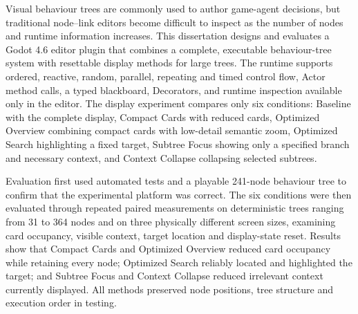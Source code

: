 \frontmatter
{}
\tableofcontents
\clearforchapter\listoffigures
\clearforchapter\listoftables

Visual behaviour trees are commonly used to author game-agent decisions, but traditional node--link editors become difficult to inspect as the number of nodes and runtime information increases. This dissertation designs and evaluates a Godot 4.6 editor plugin that combines a complete, executable behaviour-tree system with resettable display methods for large trees. The runtime supports ordered, reactive, random, parallel, repeating and timed control flow, Actor method calls, a typed blackboard, Decorators, and runtime inspection available only in the editor. The display experiment compares only six conditions: Baseline with the complete display, Compact Cards with reduced cards, Optimized Overview combining compact cards with low-detail semantic zoom, Optimized Search highlighting a fixed target, Subtree Focus showing only a specified branch and necessary context, and Context Collapse collapsing selected subtrees.

Evaluation first used automated tests and a playable 241-node behaviour tree to confirm that the experimental platform was correct. The six conditions were then evaluated through repeated paired measurements on deterministic trees ranging from 31 to 364 nodes and on three physically different screen sizes, examining card occupancy, visible context, target location and display-state reset. Results show that Compact Cards and Optimized Overview reduced card occupancy while retaining every node; Optimized Search reliably located and highlighted the target; and Subtree Focus and Context Collapse reduced irrelevant context currently displayed. All methods preserved node positions, tree structure and execution order in testing.
